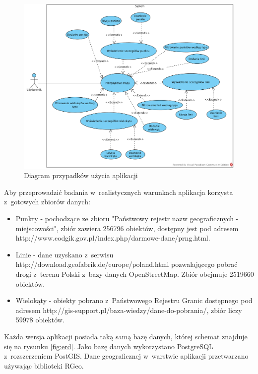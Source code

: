 \documentclass[printmode]{mgr}
\begin{document}
\begin{figure}[H]
  \centering
  \includegraphics[width=1\linewidth]{pictures/use_cases}
  \caption{Diagram przypadków użycia aplikacji}
  \label{fig:use_cases}
\end{figure}

Aby przeprowadzić badania w~realistycznych warunkach aplikacja korzysta z~gotowych zbiorów danych:
\begin{itemize}
  \item Punkty - pochodzące ze zbioru "Państwowy rejestr nazw geograficznych - miejscowości", zbiór zawiera 256796 obiektów, dostępny jest pod adresem http://www.codgik.gov.pl/index.php/darmowe-dane/prng.html.
  \item Linie - dane uzyskano z~serwisu http://download.geofabrik.de/europe/poland.html pozwalającego pobrać drogi z~terenu Polski z~bazy danych OpenStreetMap. Zbiór obejmuje 2519660 obiektów.
  \item Wielokąty - obiekty pobrano z~Państwowego Rejestru Granic dostępnego pod adresem http://gis-support.pl/baza-wiedzy/dane-do-pobrania/, zbiór liczy 59978 obiektów.
\end{itemize}

Każda wersja aplikacji posiada taką samą bazę danych, której schemat znajduje się na rysunku \ref{fig:erd}. Jako bazę danych wykorzystano PostgreSQL z~rozszerzeniem PostGIS. Dane geograficznej w~warstwie aplikacji przetwarzano używając biblioteki RGeo.
\end{document}
